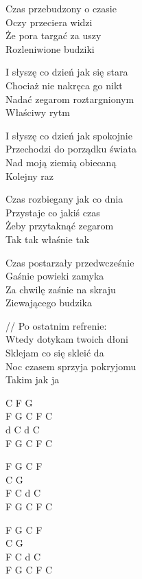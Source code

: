 \begin{text}    
    Czas przebudzony o czasie\\   
    Oczy przeciera widzi \\   
    Że pora targać za uszy\\           
    Rozleniwione budziki
	
    \vin I słyszę co dzień jak się stara\\  
    \vin Chociaż nie nakręca go nikt\\      
    \vin Nadać zegarom roztargnionym\\     
    \vin Właściwy rytm          
          
    \vin I słyszę co dzień jak spokojnie\\
    \vin Przechodzi do porządku świata\\
    \vin Nad moją ziemią obiecaną\\
    \vin Kolejny raz

    Czas rozbiegany jak co dnia\\
    Przystaje co jakiś czas\\
    Żeby przytaknąć zegarom\\
    Tak tak właśnie tak
	
    Czas postarzały przedwcześnie\\
    Gaśnie powieki zamyka\\
    Za chwilę zaśnie na skraju\\
    Ziewającego budzika	
	
	\vin // Po ostatnim refrenie:\\
    \vin Wtedy dotykam twoich dłoni\\
    \vin Sklejam co się skleić da\\
    \vin Noc czasem sprzyja pokryjomu\\
    \vin Takim jak ja
	
\end{text}
\begin{chord}
    C F G\\
    F G C F C\\
    d C d C\\
    F G C F C
	
    F G C F\\
    C G\\
    F C d C\\
    F G C F C

    F G C F\\
    C G\\
    F C d C\\
    F G C F C
\end{chord}